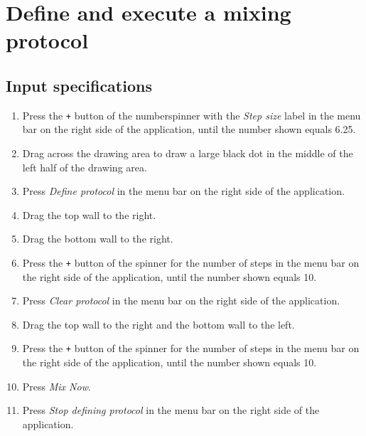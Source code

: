 \section{Define and execute a mixing protocol}

\subsection*{Input specifications}
\begin{enumerate}
\item Press the \texttt{+} button of the numberspinner with the \emph{Step size} label in the menu bar on the right side of the application, until the number shown equals 6.25.
\item Drag across the drawing area to draw a large black dot in the middle of the left half of the drawing area.
\item Press \emph{Define protocol} in the menu bar on the right side of the application.
\item Drag the top wall to the right.
\item Drag the bottom wall to the right.
\item Press the \texttt{+} button of the spinner for the number of steps in the menu bar on the right side of the application, until the number shown equals 10.
\item Press \emph{Clear protocol} in the menu bar on the right side of the application.
\item Drag the top wall to the right and the bottom wall to the left.
\item Press the \texttt{+} button of the spinner for the number of steps in the menu bar on the right side of the application, until the number shown equals 10.
\item Press \emph{Mix Now}.
\item Press \emph{Stop defining protocol} in the menu bar on the right side of the application.
\end{enumerate}

